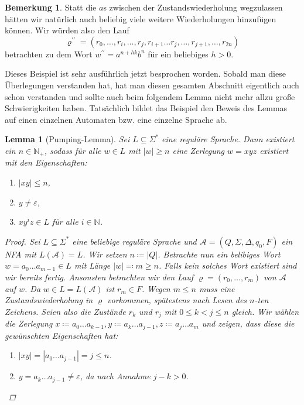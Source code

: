 \documentclass[11pt, a4paper]{article}
\theoremstyle{definition}
\newtheorem*{remark*}{Bemerkung}
\theoremstyle{plain}
\newtheorem{lemma}[definition]{Lemma}
\numberwithin{equation}{section}
\begin{document}
\begin{remark*}
	Statt die $a$s zwischen der Zustandswiederholung wegzulassen hätten wir natürlich auch beliebig viele weitere Wiederholungen hinzufügen können. Wir würden also den Lauf
	$$
		\varrho^{\prime\prime} = (r_0, \ldots, r_i, \ldots, r_j, r_{i+1} \ldots r_j, \ldots, r_{j+1}, \ldots, r_{2n})
	$$
	betrachten zu dem Wort $w^{\prime\prime} = a^{n+hk}b^n$ für ein beliebiges $h > 0$.
\end{remark*}
Dieses Beispiel ist sehr ausführlich jetzt besprochen worden. Sobald man diese Überlegungen verstanden hat, hat man diesen gesamten Abschnitt eigentlich auch schon verstanden und sollte auch beim folgendem Lemma nicht mehr allzu große Schwierigkeiten haben. Tatsächlich bildet das Beispiel den Beweis des Lemmas auf einen einzelnen Automaten bzw. eine einzelne Sprache ab.
\begin{lemma}[Pumping-Lemma]
	Sei $L \subseteq \Sigma^\ast$ eine reguläre Sprache. Dann existiert ein $n \in \mathbb{N}_+$, sodass für alle $w \in L$ mit $|w| \geq n$ eine Zerlegung $w = xyz$ existiert mit den Eigenschaften:
	\begin{enumerate}
		\item $|xy| \leq n$,
		\item $y \neq \varepsilon$,
		\item $xy^iz \in L$ für alle $i \in \mathbb{N}$. 
	\end{enumerate}
	\begin{proof}
		Sei $L \subseteq \Sigma^\ast$ eine beliebige reguläre Sprache und $\mathcal{A} = (Q, \Sigma, \Delta, q_0, F)$ ein NFA mit $L(\mathcal{A}) = L$. Wir setzen $n \coloneqq |Q|$. Betrachte nun ein belibiges Wort $w = a_0 \ldots a_{m-1} \in L$ mit Länge $|w| \eqqcolon m \geq n$. Falls kein solches Wort existiert sind wir bereits fertig. Ansonsten betrachten wir den Lauf $\varrho = (r_0, \ldots, r_m)$ von $\mathcal{A}$ auf $w$. Da $w \in L = L(\mathcal{A})$ ist $r_m \in F$. Wegen $m \leq n$ muss eine Zustandswiederholung in $\varrho$ vorkommen, spätestens nach Lesen des $n$-ten Zeichens. Seien also die Zustände $r_k$ und $r_j$ mit $0 \leq k < j \leq n$ gleich. Wir wählen die Zerlegung $x \coloneqq a_0 \ldots a_{k-1}, y \coloneqq a_k \ldots a_{j-1}, z \coloneqq a_j \ldots a_m$ und zeigen, dass diese die gewünschten Eigenschaften hat:
		\begin{enumerate}
			\item $|xy| = |a_0 \ldots a_{j-1}| = j \leq n$. \checkmark
			\item $y = a_k \ldots a_{j-1} \neq \varepsilon$, da nach Annahme $j-k > 0$. \checkmark

\end{enumerate}
\end{proof}
\end{lemma}
\end{document}
